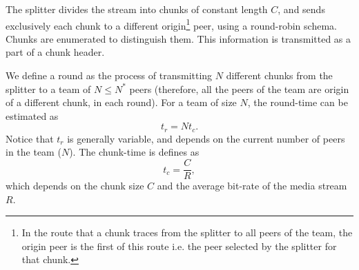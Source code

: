 

\label{sec:feeding_the_team}

The splitter divides the stream into chunks of constant length $C$,
and sends exclusively each chunk to a different
\gls{origin}\footnote{In the route that a chunk traces from the
  splitter to all peers of the team, the origin peer is the first of
  this route i.e. the peer selected by the splitter for that chunk.}
peer, using a round-robin schema. Chunks are enumerated to distinguish
them. This information is transmitted as a part of a chunk header.

\begin{comment}
More details about the implementation
are available in Fig.~\ref{fig:chunk_generation}.


\begin{figure*}
  \fig{500}{5cm}{DBS_splitter_feed} \caption{Chunk
    generation at the splitter and their transmission to the
    team.\label{fig:chunk_generation}}
\end{figure*}
\end{comment}

We define a \gls{round} as the process of transmitting $N$ different
chunks from the splitter to a team of $N\leq N^*$ peers (therefore,
all the peers of the team are origin of a different chunk, in each
round). For a team of size $N$, the \gls{round-time} can be estimated
as
\begin{equation}
  t_r=Nt_c.
\end{equation}
Notice that $t_r$ is generally variable, and depends on
the current number of peers in the team ($N$). The
\gls{chunk-time} is defines as 
\begin{equation}
  \label{eq:chunk_time}
  t_c=\frac{C}{R},
\end{equation}
which depends on the chunk size $C$ and the average bit-rate of the
media stream $R$.

\begin{comment}
(in a team) as the time necessary to send two consecutive chunks from
  the splitter (of such team) to the same peer, using the
  round-robing. This time is variable and depends on $|T|$, $C$, and
  the average bit-rate of the media, $A$.
\end{comment}

